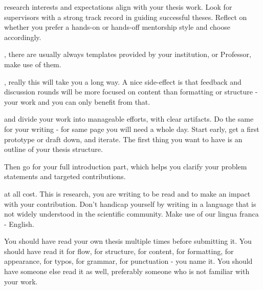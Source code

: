 \documentclass{../sharedAssets/tufte}
\begin{document}
 research interests and expectations align with your thesis work.
  Look for supervisors with a strong track record in guiding successful theses. 
  Reflect on whether you prefer a hands-on or hands-off mentorship style and choose accordingly.

, there are usually always templates provided by your institution, or Professor, make use of them.


, really this will take you a long way. A nice side-effect is that feedback and discussion 
rounds will be more focused on content than formatting or structure - your work and you can only benefit from that.

 and divide your work into manageable efforts, with clear artifacts. Do the same for your writing - for same page you will need a whole day. 
Start early, get a first prototype or draft down, and iterate. The first thing you want to have is an outline of your thesis structure.


 Then go for your full introduction part, which helps you clarify your problem statements and targeted contributions. 

 at all cost. This is research, you are writing to be read and to make an impact with your contribution.
Don't handicap yourself by writing in a language that is not widely understood in the scientific community. Make use of our lingua franca - English. 


You should have read your own thesis multiple times before submitting it. 
You should have read it for flow, for structure, for content, for formatting, for appearance, for typos, for grammar, for punctuation - you name it.
You should have someone else read it as well, preferably someone who is not familiar with your work.
\end{document}
